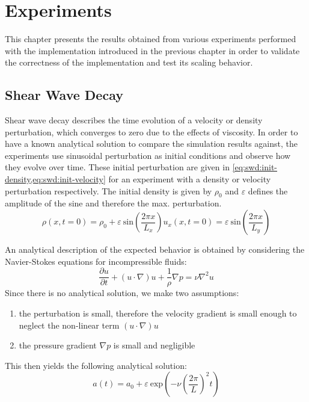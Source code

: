 \section{Experiments}

This chapter presents the results obtained from various experiments performed with the implementation introduced in the previous chapter in order to validate the correctness of the implementation and test its scaling behavior.

\subsection{Shear Wave Decay}

Shear wave decay describes the time evolution of a velocity or density perturbation, which converges to zero due to the effects of viscosity. In order to have a known analytical solution to compare the simulation results against, the experiments use sinusoidal perturbation as initial conditions and observe how they evolve over time. These initial perturbation are given in \cref{eq:swd:init-density,eq:swd:init-velocity} for an experiment with a density or velocity perturbation respectively. The initial density is given by $\rho_0$ and $\varepsilon$ defines the amplitude of the sine and therefore the max. perturbation.
\begin{subequations}
    \begin{equation}
        \rho(x, t=0) = \rho_0 + \varepsilon~\text{sin}\left(\frac{2 \pi x}{L_x}\right)
        \label{eq:swd:init-density}
    \end{equation}
    \begin{equation}
        u_x(x, t=0) = \varepsilon~\text{sin}\left(\frac{2 \pi x}{L_y}\right)
        \label{eq:swd:init-velocity}
    \end{equation}
\end{subequations}

An analytical description of the expected behavior is obtained by considering the Navier-Stokes equations for incompressible fluids:
\begin{equation}
    \frac{\partial u}{\partial t} + (u\cdot\nabla)u + \frac{1}{\rho}\nabla p = \nu\nabla^2u
    \label{eq:swd:navier-stokes}
\end{equation}
Since there is no analytical solution, we make two assumptions:
\begin{enumerate}
    \item the perturbation is small, therefore the velocity gradient is small enough to neglect the non-linear term $(u\cdot\nabla)u$
    \item the pressure gradient $\nabla p$ is small and negligible
\end{enumerate}
This then yields the following analytical solution:
\begin{equation}
    a(t) = a_0 + \varepsilon~\text{exp}\left(-\nu \left(\frac{2\pi}{L}\right)^2 t\right)
    \label{eq:swd:analytica-solution}
\end{equation}

